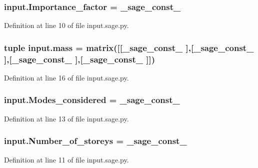 \subsubsection[{Importance\+\_\+factor}]{\setlength{\rightskip}{0pt plus 5cm}input.\+Importance\+\_\+factor = \+\_\+sage\+\_\+const\+\_}\label{namespaceinput_a0840d963ea24db338f3ab4457defb494}


Definition at line 10 of file input.\+sage.\+py.

\hypertarget{namespaceinput_af91e2c1a9ecd07a9c8dcf3a5fc8b2b60}{}
\subsubsection[{mass}]{\setlength{\rightskip}{0pt plus 5cm}tuple input.\+mass = matrix(\mbox{[}\mbox{[}\+\_\+sage\+\_\+const\+\_ \mbox{]},\mbox{[}\+\_\+sage\+\_\+const\+\_ \mbox{]},\mbox{[}\+\_\+sage\+\_\+const\+\_ \mbox{]},\mbox{[}\+\_\+sage\+\_\+const\+\_ \mbox{]}\mbox{]})}\label{namespaceinput_af91e2c1a9ecd07a9c8dcf3a5fc8b2b60}


Definition at line 16 of file input.\+sage.\+py.

\hypertarget{namespaceinput_adb7aca4735796aaa4a46456d3edeac2e}{}
\subsubsection[{Modes\+\_\+considered}]{\setlength{\rightskip}{0pt plus 5cm}input.\+Modes\+\_\+considered = {\bf \+\_\+sage\+\_\+const\+\_}}\label{namespaceinput_adb7aca4735796aaa4a46456d3edeac2e}


Definition at line 13 of file input.\+sage.\+py.

\hypertarget{namespaceinput_a10237b312ba44e8c8090db86059c5803}{}
\subsubsection[{Number\+\_\+of\+\_\+storeys}]{\setlength{\rightskip}{0pt plus 5cm}input.\+Number\+\_\+of\+\_\+storeys = \+\_\+sage\+\_\+const\+\_}\label{namespaceinput_a10237b312ba44e8c8090db86059c5803}


Definition at line 11 of file input.\+sage.\+py.


